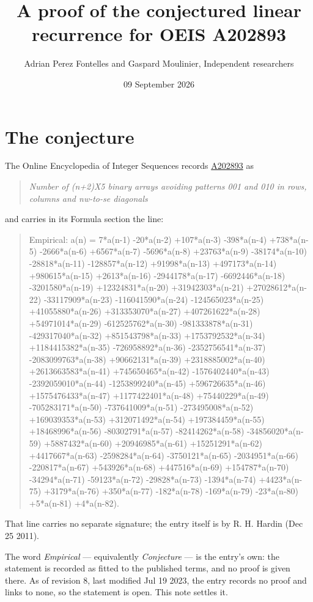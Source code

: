 \documentclass[11pt]{article}
\title{A proof of the conjectured linear recurrence for OEIS A202893}
\author{Adrian Perez Fontelles and Gaspard Moulinier, Independent researchers}
\date{09 September 2026}
\theoremstyle{definition}
\begin{document}
\maketitle
\section{The conjecture}

The Online Encyclopedia of Integer Sequences records \href{https://oeis.org/A202893}{A202893} as

\begin{quote}\itshape Number of (n+2)X5 binary arrays avoiding patterns 001 and 010 in rows, columns and nw-to-se diagonals\end{quote}

and carries in its Formula section the line:

\begin{quote}\ttfamily Empirical: a(n) = 7*a(n-1) -20*a(n-2) +107*a(n-3) -398*a(n-4) +738*a(n-5) -2666*a(n-6) +6567*a(n-7) -5696*a(n-8) +23763*a(n-9) -38174*a(n-10) -28818*a(n-11) -128857*a(n-12) +91998*a(n-13) +497173*a(n-14) +980615*a(n-15) +2613*a(n-16) -2944178*a(n-17) -6692446*a(n-18) -3201580*a(n-19) +12324831*a(n-20) +31942303*a(n-21) +27028612*a(n-22) -33117909*a(n-23) -116041590*a(n-24) -124565023*a(n-25) +41055880*a(n-26) +313353070*a(n-27) +407261622*a(n-28) +54971014*a(n-29) -612525762*a(n-30) -981333878*a(n-31) -429317040*a(n-32) +851543798*a(n-33) +1753792532*a(n-34) +1184415382*a(n-35) -726958892*a(n-36) -2352756541*a(n-37) -2083099763*a(n-38) +90662131*a(n-39) +2318885002*a(n-40) +2613663583*a(n-41) +745650465*a(n-42) -1576402440*a(n-43) -2392059010*a(n-44) -1253899240*a(n-45) +596726635*a(n-46) +1575476433*a(n-47) +1177422401*a(n-48) +75440229*a(n-49) -705283171*a(n-50) -737641009*a(n-51) -273495008*a(n-52) +169039353*a(n-53) +312071492*a(n-54) +197384459*a(n-55) +18468996*a(n-56) -80302791*a(n-57) -82414262*a(n-58) -34856020*a(n-59) +5887432*a(n-60) +20946985*a(n-61) +15251291*a(n-62) +4417667*a(n-63) -2598284*a(n-64) -3750121*a(n-65) -2034951*a(n-66) -220817*a(n-67) +543926*a(n-68) +447516*a(n-69) +154787*a(n-70) -34294*a(n-71) -59123*a(n-72) -29828*a(n-73) -1394*a(n-74) +4423*a(n-75) +3179*a(n-76) +350*a(n-77) -182*a(n-78) -169*a(n-79) -23*a(n-80) +5*a(n-81) +4*a(n-82).\end{quote}

That line carries no separate signature; the entry itself is by R. H. Hardin (Dec 25 2011).

The word {\itshape Empirical} --- equivalently {\itshape Conjecture} --- is the entry's own: the statement is recorded as fitted to the published terms, and no proof is given there. As of revision 8, last modified Jul 19 2023, the entry records no proof and links to none, so the statement is open. This note settles it.
\end{document}
